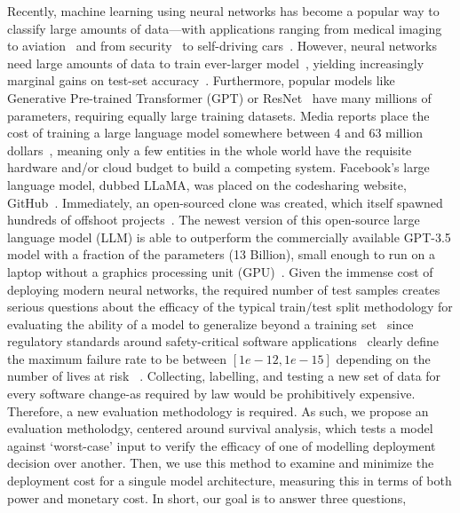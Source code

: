 \documentclass[conference]{IEEEtran}
\begin{document}
Recently, machine learning using neural networks has become a popular way to classify large amounts of data---with applications ranging from medical imaging~\cite{ai_medical_imaging} to aviation~\cite{ai_aviation} and from security~\cite{ai_security,ai_luggage,ai_prison} to self-driving cars~\cite{ai_automotive}. However, neural networks need large amounts of data\cite{desislavov2021compute,bailly2022effects} to train ever-larger model~\cite{desislavov2021compute}, yielding increasingly marginal gains on test-set accuracy~\cite{sun2017revisiting}. Furthermore, popular models like Generative Pre-trained Transformer (GPT)\cite{floridi2020gpt} or ResNet~\cite{resnet} have many millions of parameters, requiring equally large training datasets. Media reports place the cost of training a large language model somewhere between 4 and 63 million dollars~\cite{}, meaning only a few entities in the whole world have the requisite hardware and/or cloud budget to build a competing system. Facebook's large language model, dubbed LLaMA, was placed on the codesharing website, GitHub~\cite{llama}. Immediately, an open-sourced clone was created, which itself spawned hundreds of offshoot projects~\cite{openllama}. The newest version of this open-source large language model (LLM) is able to outperform the commercially available GPT-3.5 model with a fraction of the parameters (13 Billion), small enough to run on a laptop without a graphics processing unit (GPU)~\cite{liu2023goat}. Given the immense cost of deploying modern neural networks, the required number of test samples creates serious questions about the efficacy of the typical train/test split methodology for evaluating the ability of a model to generalize beyond a training set~\cite{meyers} since regulatory standards around safety-critical software applications~\cite{IEC61508,iso26262,aviation_software,safetyframework} clearly define the maximum failure rate to be between $[1e-12, 1e-15]$ depending on the number of lives at risk ~\cite{iso26262}. Collecting, labelling, and testing a new set of data for every software change-as required by law would be prohibitively expensive. Therefore, a new evaluation methodology is required. As such, we propose an evaluation metholodgy, centered around survival analysis, which tests a model against `worst-case' input to verify the efficacy of one of modelling deployment decision over another. Then, we use this method to examine and minimize the deployment cost for a singule model architecture, measuring this in terms of both power and monetary cost. In short, our goal is to answer three questions, 
\end{document}
